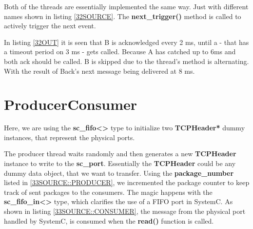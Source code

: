 \documentclass[a4paper,12pt]{report}    %
\begin{document}
Both of the threads are essentially implemented the same way. Just with different names shown in listing \ref{32SOURCE}. The \textbf{next\_trigger()} method is called to actively trigger the next event.

 
\newpage
In listing \ref{32OUT} it is seen that B is acknowledged every 2 ms, until a - that has a timeout period on 3 ms - gets called. Because A has catched up to 6ms and both ack should be called. B is skipped due to the thread's method is alternating. With the result of Back's next message being delivered at 8 ms.

\lstset{style=output}






\section{ProducerConsumer}

Here, we are using the \textbf{sc\_fifo<>} type to initialize two \textbf{TCPHeader*} dummy instances, that represent the physical ports. 

\lstset{style=code}


The producer thread waits randomly and then generates a new \textbf{TCPHeader} instance to write to the \textbf{sc\_port}. Essentially the \textbf{TCPHeader} could be any dummy data object, that we want to transfer. Using the \textbf{package\_number} listed in \ref{33SOURCE::PRODUCER}, we incremented the package counter to keep track of sent packages to the consumers. The magic happens with the \textbf{sc\_fifo\_in<>} type, which clarifies the use of a FIFO port in SystemC. As shown in listing \ref{33SOURCE::CONSUMER}, the message from the physical port handled by SystemC, is consumed when the \textbf{read()} function is called.
\newpage

\end{document}
